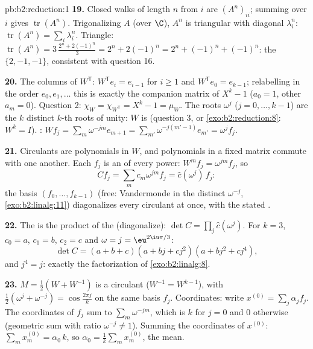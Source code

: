 \begin{solution}{pb:b2:reduction:1}
\textbf{19.} Closed walks of length $n$ from $i$ are
$(A^n)_{ii}$; summing over $i$ gives $\operatorname{tr}(A^n)$.
Trigonalizing $A$ (over $\C$), $A^n$ is triangular with diagonal
$\lambda_i^n$: $\operatorname{tr}(A^n) = \sum_i\lambda_i^n$.
Triangle: $\operatorname{tr}(A^n) = 3\,\frac{2^n + 2(-1)^n}3 =
2^n + 2(-1)^n = 2^n + (-1)^n + (-1)^n$: the  $\{2, -1,
-1\}$, consistent with question 16.

\textbf{20.} The columns of $W^{\mathsf T}$: $W^{\mathsf T}e_i =
e_{i-1}$ for $i \geq 1$ and $W^{\mathsf T}e_0 = e_{k-1}$;
relabelling in the order $e_0, e_1, \dots$ this is exactly the
companion matrix of $X^k - 1$ ($a_0 = 1$, other $a_m = 0$).
Question 2: $\chi_{W} = \chi_{W^{\mathsf T}} = X^k - 1 =
\mu_{W}$. The roots $\omega^j$ ($j = 0, \dots, k-1$) are the $k$
distinct $k$-th roots of unity: $W$ is  (question
3, or \cref{exo:b2:reduction:8}: $W^k = I$). : $Wf_j
= \sum_m \omega^{-jm}e_{m+1} = \sum_{m'}\omega^{-j(m'-1)}e_{m'}
= \omega^j f_j$.

\textbf{21.} Circulants are polynomials in $W$, and polynomials
in a fixed matrix commute with one another. Each $f_j$ is an
 of every power: $W^m f_j = \omega^{jm}f_j$, so
\[
Cf_j = \sum_m c_m\omega^{jm} f_j = \widehat c(\omega^j)\,f_j :
\]
the basis $(f_0, \dots, f_{k-1})$ (free: Vandermonde in the
distinct $\omega^{-j}$, \cref{exo:b2:linalg:11}) diagonalizes
every circulant at once, with the stated .

\textbf{22.} The  is the product of the 
(diagonalize): $\det C = \prod_{j}\widehat c(\omega^j)$. For $k
= 3$, $c_0 = a$, $c_1 = b$, $c_2 = c$ and $\omega = j =
\eu^{2\iu\pi/3}$:
\[
\det C = (a + b + c)(a + bj + cj^2)(a + bj^2 + cj^4),
\]
and $j^4 = j$: exactly the factorization of
\cref{exo:b2:linalg:8}.

\textbf{23.} $M = \frac12(W + W^{-1})$ is a circulant ($W^{-1} =
W^{k-1}$), with  $\frac12(\omega^j + \omega^{-j}) =
\cos\frac{2\pi j}k$ on the same basis $f_j$. Coordinates: write
$x^{(0)} = \sum_j \alpha_j f_j$. The coordinates of $f_j$ sum to
$\sum_m \omega^{-jm}$, which is $k$ for $j = 0$ and $0$
otherwise (geometric sum with ratio $\omega^{-j} \neq 1$).
Summing the coordinates of $x^{(0)}$: $\sum_m x^{(0)}_m =
\alpha_0\,k$, so $\alpha_0 = \frac1k\sum_m x^{(0)}_m$, the mean.


\end{solution}
